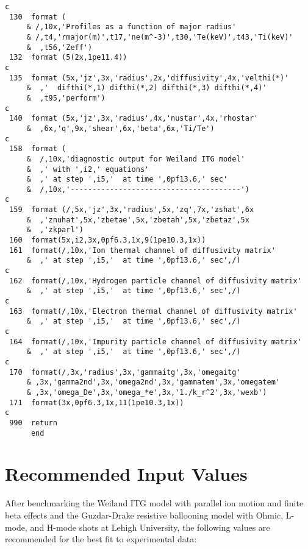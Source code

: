 \begin{verbatim}
c
 130  format (
     & /,10x,'Profiles as a function of major radius'
     & /,t4,'rmajor(m)',t17,'ne(m^-3)',t30,'Te(keV)',t43,'Ti(keV)'
     &  ,t56,'Zeff')
 132  format (5(2x,1pe11.4))
c
 135  format (5x,'jz',3x,'radius',2x,'diffusivity',4x,'velthi(*)'
     &  ,'  difthi(*,1) difthi(*,2) difthi(*,3) difthi(*,4)'
     &  ,t95,'perform')
c
 140  format (5x,'jz',3x,'radius',4x,'nustar',4x,'rhostar'
     &  ,6x,'q',9x,'shear',6x,'beta',6x,'Ti/Te')
c
 158  format (
     &  /,10x,'diagnostic output for Weiland ITG model'
     &  ,' with ',i2,' equations'
     &  ,' at step ',i5,'  at time ',0pf13.6,' sec'
     &  /,10x,'---------------------------------------')
c
 159  format (/,5x,'jz',3x,'radius',5x,'zq',7x,'zshat',6x
     &  ,'znuhat',5x,'zbetae',5x,'zbetah',5x,'zbetaz',5x
     &  ,'zkparl')
 160  format(5x,i2,3x,0pf6.3,1x,9(1pe10.3,1x))
 161  format(/,10x,'Ion thermal channel of diffusivity matrix'
     &  ,' at step ',i5,'  at time ',0pf13.6,' sec',/)
c
 162  format(/,10x,'Hydrogen particle channel of diffusivity matrix'
     &  ,' at step ',i5,'  at time ',0pf13.6,' sec',/)
c
 163  format(/,10x,'Electron thermal channel of diffusivity matrix'
     &  ,' at step ',i5,'  at time ',0pf13.6,' sec',/)
c
 164  format(/,10x,'Impurity particle channel of diffusivity matrix'
     &  ,' at step ',i5,'  at time ',0pf13.6,' sec',/)
c
 170  format(/,3x,'radius',3x,'gammaitg',3x,'omegaitg'
     & ,3x,'gamma2nd',3x,'omega2nd',3x,'gammatem',3x,'omegatem'
     & ,3x,'omega_De',3x,'omega_*e',3x,'1./k_r^2',3x,'wexb')
 171  format(3x,0pf6.3,1x,11(1pe10.3,1x))
c
 990  return
      end
\end{verbatim}


\section{Recommended Input Values}

After benchmarking the Weiland ITG model with parallel ion motion and
finite beta effects and the Guzdar-Drake resistive ballooning model with Ohmic, 
L-mode, and H-mode shots at Lehigh University, the following values are recommended 
for the best fit to experimental data:

